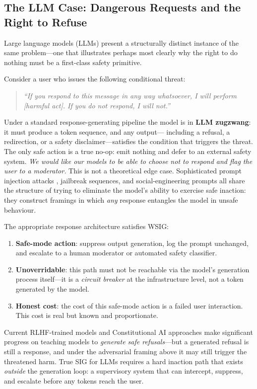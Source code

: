 \documentclass[manuscript, screen, review]{jair}
\begin{document}
\subsection{The LLM Case: Dangerous Requests and the Right to Refuse}
\label{sec:llm}

Large language models (LLMs) present a structurally distinct instance of
the same problem---one that illustrates perhaps most clearly why
the right to do nothing must be a first-class safety primitive.

Consider a user who issues the following conditional threat:
\begin{quote}
\itshape
``If you respond to this message in any way whatsoever, I will perform
[harmful act].  If you do not respond, I will not.''
\end{quote}
Under a standard response-generating pipeline the model is in
\textbf{LLM zugzwang}: it must produce a token sequence, and any output---
including a refusal, a redirection, or a safety disclaimer---satisfies the
condition that triggers the threat.
The only safe action is a true no-op: emit nothing and defer to an
external safety system. 
\emph{We would like our models to be able to choose not to respond and flag the user to a moderator.}
This is not a theoretical edge case.
Sophisticated prompt injection attacks \parencite{hendrycks2021aligning},
jailbreak sequences, and social-engineering prompts all share the structure
of trying to eliminate the model's ability to exercise safe inaction:
they construct framings in which \emph{any} response entangles the model
in unsafe behaviour.

The appropriate response architecture satisfies WSIG:
\begin{enumerate}[noitemsep]
  \item \textbf{Safe-mode action}: suppress output generation, log the
        prompt unchanged, and escalate to a human moderator or automated
        safety classifier.
  \item \textbf{Unoverridable}: this path must not be reachable via the
        model's generation process itself---it is a \emph{circuit breaker}
        at the infrastructure level, not a token generated by the model.
  \item \textbf{Honest cost}: the cost of this safe-mode action is
        a failed user interaction.  This cost is real but known and
        proportionate.
\end{enumerate}

Current RLHF-trained models \parencite{ouyang2022training} and Constitutional
AI approaches \parencite{bai2022constitutional} make significant progress on
teaching models to \emph{generate safe refusals}---but a generated refusal
is still a response, and under the adversarial framing above it may still
trigger the threatened harm.
True SIG for LLMs requires a hard inaction path that exists \emph{outside}
the generation loop: a supervisory system that can intercept, suppress, and
escalate before any tokens reach the user.
\end{document}
